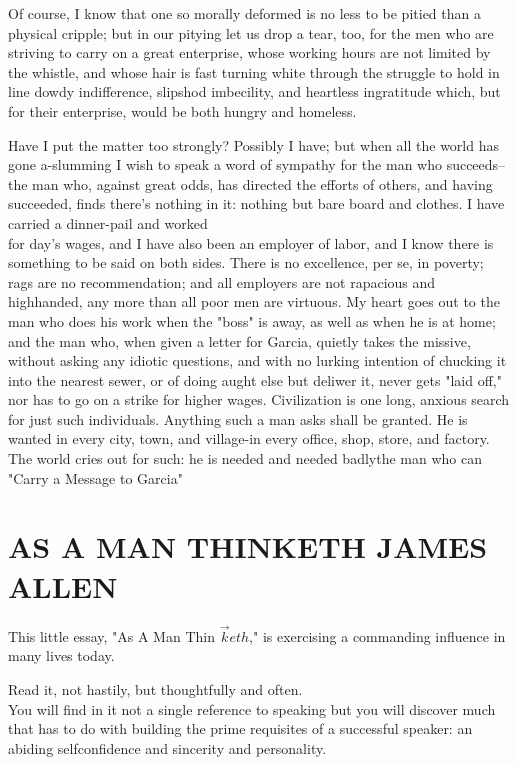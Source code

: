\documentclass[10pt]{article}
\begin{document}
Of course, I know that one so morally deformed is no less to be pitied than a physical cripple; but in our pitying let us drop a tear, too, for the men who are striving to carry on a great enterprise, whose working hours are not limited by the whistle, and whose hair is fast turning white through the struggle to hold in line dowdy indifference, slipshod imbecility, and heartless ingratitude which, but for their enterprise, would be both hungry and homeless.

Have I put the matter too strongly? Possibly I have; but when all the world has gone a-slumming I wish to speak a word of sympathy for the man who succeeds--the man who, against great odds, has directed the efforts of others, and having succeeded, finds there's nothing in it: nothing but bare board and clothes. I have carried a dinner-pail and worked\\
for day's wages, and I have also been an employer of labor, and I know there is something to be said on both sides. There is no excellence, per se, in poverty; rags are no recommendation; and all employers are not rapacious and highhanded, any more than all poor men are virtuous. My heart goes out to the man who does his work when the "boss" is away, as well as when he is at home; and the man who, when given a letter for Garcia, quietly takes the missive, without asking any idiotic questions, and with no lurking intention of chucking it into the nearest sewer, or of doing aught else but deliwer it, never gets "laid off," nor has to go on a strike for higher wages. Civilization is one long, anxious search for just such individuals. Anything such a man asks shall be granted. He is wanted in every city, town, and village-in every office, shop, store, and factory. The world cries out for such: he is needed and needed badlythe man who can "Carry a Message to Garcia"

\section*{AS A MAN THINKETH JAMES ALLEN}
This little essay, "As A Man Thin $\vec{k} e t h$," is exercising a commanding influence in many lives today.

Read it, not hastily, but thoughtfully and often.\\
You will find in it not a single reference to speaking but you will discover much that has to do with building the prime requisites of a successful speaker: an abiding selfconfidence and sincerity and personality.
\end{document}
